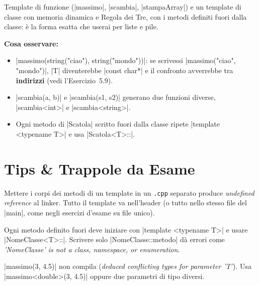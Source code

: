 Template di funzione (\cc|massimo|, \cc|scambia|, \cc|stampaArray|) e un template di
classe con memoria dinamica e Regola dei Tre, con i metodi definiti fuori dalla
classe: è la forma esatta che userai per liste e pile.


\textbf{Cosa osservare:}
\begin{itemize}
  \item \cc|massimo(string("ciao"), string("mondo"))|: se scrivessi
        \cc|massimo("ciao", "mondo")|, \cc|T| diventerebbe \cc|const char*| e il
        confronto avverrebbe tra \textbf{indirizzi} (vedi l'Esercizio~5.9).
  \item \cc|scambia(a, b)| e \cc|scambia(s1, s2)| generano due funzioni diverse,
        \cc|scambia<int>| e \cc|scambia<string>|.
  \item Ogni metodo di \cc|Scatola| scritto fuori dalla classe ripete
        \cc|template <typename T>| e usa \cc|Scatola<T>::|.
\end{itemize}

\section{Tips \& Trappole da Esame}

\begin{trappola}
Mettere i corpi dei metodi di un template in un \texttt{.cpp} separato produce
\emph{undefined reference} al linker. Tutto il template va nell'header (o tutto
nello stesso file del \cc|main|, come negli esercizi d'esame su file unico).
\end{trappola}

\begin{trappola}
Ogni metodo definito fuori deve iniziare con \cc|template <typename T>| e usare
\cc|NomeClasse<T>::|. Scrivere solo \cc|NomeClasse::metodo| dà errori come
\emph{'NomeClasse' is not a class, namespace, or enumeration}.
\end{trappola}

\begin{trappola}
\cc|massimo(3, 4.5)| non compila (\emph{deduced conflicting types for parameter 'T'}).
Usa \cc|massimo<double>(3, 4.5)| oppure due parametri di tipo diversi.
\end{trappola}

